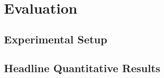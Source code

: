 %
%
%
%
%
%
%

\chapter{Evaluation}
\label{chap:results}

\section{Experimental Setup}
\label{sec:experimental-setup}



\section{Headline Quantitative Results}
\label{sec:quantitative-results}

